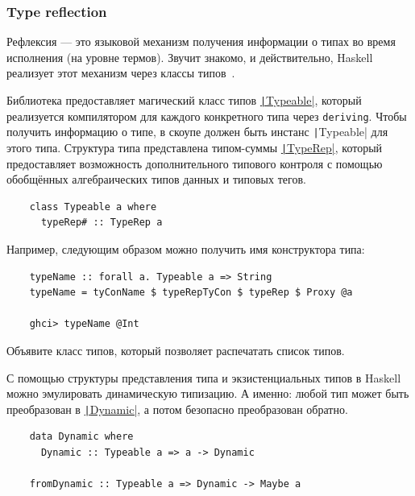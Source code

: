 
\subsubsection{Type reflection} \label{subsubsec:type-reflection}

Рефлексия --- это языковой механизм получения информации о типах во время исполнения (на уровне термов).
Звучит знакомо, и действительно, Haskell реализует этот механизм через классы типов~\cite{peyton2016reflection}.

Библиотека предоставляет магический класс типов \href{https://hackage.haskell.org/package/base-4.20.0.1/docs/Type-Reflection.html}{\texttt|Typeable|}, который реализуется компилятором для каждого конкретного типа через \texttt{deriving}.
Чтобы получить информацию о типе, в скоупе должен быть инстанс \texttt|Typeable| для этого типа.
Структура типа представлена типом-суммы \href{https://hackage.haskell.org/package/ghc-internal-9.1001.0/docs/src/GHC.Internal.Data.Typeable.Internal.html#TypeRep}{\texttt|TypeRep|}, который предоставляет возможность дополнительного типового контроля с помощью обобщённых алгебраических типов данных и типовых тегов.
\begin{verbatim}
    class Typeable a where
      typeRep# :: TypeRep a
\end{verbatim}

Например, следующим образом можно получить имя конструктора типа:
\begin{verbatim}
    typeName :: forall a. Typeable a => String
    typeName = tyConName $ typeRepTyCon $ typeRep $ Proxy @a

    ghci> typeName @Int
\end{verbatim}

\begin{task}
    Объявите класс типов, который позволяет распечатать список типов.
\end{task}

С помощью структуры представления типа и экзистенциальных типов в Haskell можно эмулировать динамическую типизацию.
А именно: любой тип может быть преобразован в \href{}{\texttt|Dynamic|}, а потом безопасно преобразован обратно.
\begin{verbatim}
    data Dynamic where
      Dynamic :: Typeable a => a -> Dynamic

    fromDynamic :: Typeable a => Dynamic -> Maybe a
\end{verbatim}

